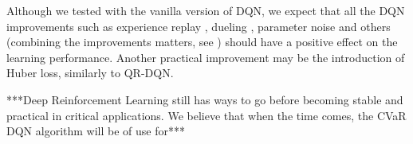 Although we tested with the vanilla version of DQN, we expect that all the DQN improvements such as experience replay \citep{hessel2017rainbow}, dueling \citep{wang2015dueling}, parameter noise \citep{plappert2017parameter} and others (combining the improvements matters, see \citep{hessel2017rainbow}) should have a positive effect on the learning performance. Another practical improvement may be the introduction of Huber loss, similarly to QR-DQN.

***Deep Reinforcement Learning still has ways to go before becoming stable and practical in critical applications. We believe that when the time comes, the CVaR DQN algorithm will be of use for***





